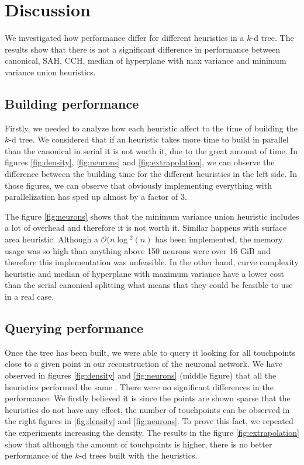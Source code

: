 \chapter{Discussion}
\label{chapter:discussiona}
We investigated how performance differ for different heuristics in a $k$-d tree. The results show that there is not a significant difference in performance between canonical, SAH, CCH, median of hyperplane with max variance and minimum variance union heuristics.

\section{Building performance}
Firstly, we needed to analyze how each heuristic affect to the time of building the $k$-d tree. We considered that if an heuristic takes more time to build in parallel than the canonical in serial it is not worth it, due to the great amount of time. In figures \ref{fig:density}, \ref{fig:neurons} and \ref{fig:extrapolation}, we can observe the difference between the building time for the different heuristics in the left side. In those figures, we can observe that obviously implementing everything with parallelization has sped up almost by a factor of 3. 

The figure \ref{fig:neurons} shows that the minimum variance union heuristic includes a lot of overhead and therefore it is not worth it. Similar happens with surface area heuristic. Although a $\mathcal{O}(n\log{}^2(n)$ has been implemented, the memory usage was so high than anything above 150 neurons were over 16 GiB and therefore this implementation was unfeasible. In the other hand, curve complexity heuristic and median of hyperplane with maximum variance have a lower cost than the serial canonical splitting what means that they could be feasible to use in a real case.

\section{Querying performance}
Once the tree has been built, we were able to query it looking for all touchpoints close to a given point in our reconstruction of the neuronal network. We have observed in figures  \ref{fig:density} and \ref{fig:neurons} (middle figure) that all the heuristics performed the same . There were no significant differences in the performance. We firstly believed it is since the points are shown sparse that the heuristics do not have any effect, the number of touchpoints can be observed in the right figures in \ref{fig:density} and \ref{fig:neurons}. To prove this fact, we repeated the experiments increasing the density. The results in the figure \ref{fig:extrapolation} show that although the amount of touchpoints is higher, there is no better performance of the $k$-d trees built with the heuristics.

